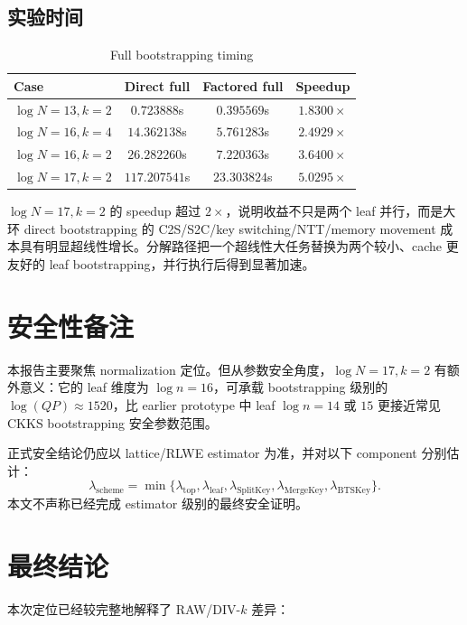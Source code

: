 \documentclass[UTF8,a4paper,11pt]{ctexart}
\begin{document}
\subsection{实验时间}

\begin{table}[H]
\centering
\caption{Full bootstrapping timing}
\begin{tabular}{lccc}
\toprule
Case & Direct full & Factored full & Speedup \\
\midrule
$\log N=13,k=2$ & $0.723888$s & $0.395569$s & $1.8300\times$ \\
$\log N=16,k=4$ & $14.362138$s & $5.761283$s & $2.4929\times$ \\
$\log N=16,k=2$ & $26.282260$s & $7.220363$s & $3.6400\times$ \\
$\log N=17,k=2$ & $117.207541$s & $23.303824$s & $5.0295\times$ \\
\bottomrule
\end{tabular}
\end{table}

$\log N=17,k=2$ 的 speedup 超过 $2\times$，说明收益不只是两个 leaf 并行，而是大环 direct bootstrapping 的 C2S/S2C/key switching/NTT/memory movement 成本具有明显超线性增长。分解路径把一个超线性大任务替换为两个较小、cache 更友好的 leaf bootstrapping，并行执行后得到显著加速。

\section{安全性备注}

本报告主要聚焦 normalization 定位。但从参数安全角度，$\log N=17,k=2$ 有额外意义：它的 leaf 维度为 $\log n=16$，可承载 bootstrapping 级别的 $\log(QP)\approx1520$，比 earlier prototype 中 leaf $\log n=14$ 或 $15$ 更接近常见 CKKS bootstrapping 安全参数范围。

正式安全结论仍应以 lattice/RLWE estimator 为准，并对以下 component 分别估计：
\begin{equation}
\lambda_{\mathrm{scheme}}
=
\min\{\lambda_{\mathrm{top}},\lambda_{\mathrm{leaf}},
\lambda_{\mathrm{SplitKey}},\lambda_{\mathrm{MergeKey}},\lambda_{\mathrm{BTSKey}}\}.
\end{equation}
本文不声称已经完成 estimator 级别的最终安全证明。

\section{最终结论}

本次定位已经较完整地解释了 RAW/DIV-$k$ 差异：
\end{document}
